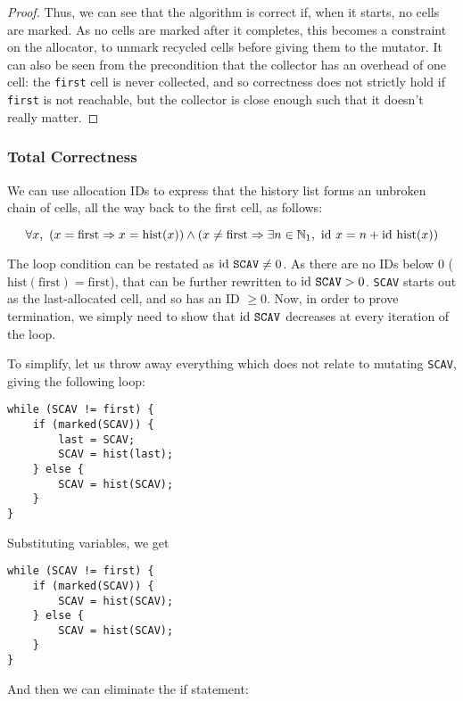 \begin{proof}
  Thus, we can see that the algorithm is correct if, when it starts,
  no cells are marked. As no cells are marked after it completes, this
  becomes a constraint on the allocator, to unmark recycled cells
  before giving them to the mutator. It can also be seen from the
  precondition that the collector has an overhead of one cell: the
  \texttt{first} cell is never collected, and so correctness does not
  strictly hold if \texttt{first} is not reachable, but the collector
  is close enough such that it doesn't really matter.
\end{proof}

\subsubsection{Total Correctness}
\label{sec:marksweep-example-total}

We can use allocation IDs to express that the history list forms an
unbroken chain of cells, all the way back to the first cell, as
follows:

\[\forall x,\ \left(x = \mathrm{first} \Rightarrow x =
  \mathrm{hist}(x)\right) \land \left(x \neq \mathrm{first} \Rightarrow
  \exists n \in \mathbb N_{1},\ \mathrm{id}~x = n +
  \mathrm{id}~\mathrm{hist}(x)\right)\]

The loop condition can be restated as $\mathrm{id}~\mathtt{SCAV} \neq 0$. As
there are no IDs below 0 ($\mathrm{hist}(\mathrm{first}) =
\mathrm{first}$), that can be further rewritten to $\mathrm{id}~\mathtt{SCAV}
> 0$. \texttt{SCAV} starts out as the last-allocated cell, and so has
an ID $\geq 0$. Now, in order to prove termination, we simply need to
show that $\mathrm{id}~\mathtt{SCAV}$ decreases at every iteration of the
loop.

To simplify, let us throw away everything which does not relate to
mutating \texttt{SCAV}, giving the following loop:

\begin{lstlisting}
while (SCAV != first) {
    if (marked(SCAV)) {
        last = SCAV;
        SCAV = hist(last);
    } else {
        SCAV = hist(SCAV);
    }
}
\end{lstlisting}

Substituting variables, we get

\begin{lstlisting}
while (SCAV != first) {
    if (marked(SCAV)) {
        SCAV = hist(SCAV);
    } else {
        SCAV = hist(SCAV);
    }
}
\end{lstlisting}

And then we can eliminate the if statement:

